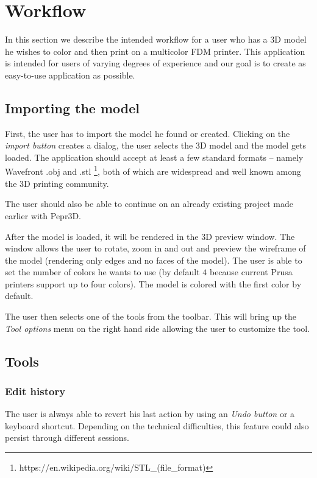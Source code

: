 \section{Workflow}

In this section we describe the intended workflow for a user who has a 3D model he wishes to color and then print on a multicolor FDM printer. This application is intended for users of varying degrees of experience and our goal is to create as easy-to-use application as possible.

\subsection{Importing the model}

First, the user has to import the model he found or created. Clicking on the \textit{import button} creates a dialog, the user selects the 3D model and the model gets loaded. The application should accept at least a few standard formats -- namely Wavefront $.$obj and $.$stl \footnote{https://en.wikipedia.org/wiki/STL\_(file\_format)}, both of which are widespread and well known among the 3D printing community.

The user should also be able to continue on an already existing project made earlier with Pepr3D.

After the model is loaded, it will be rendered in the 3D preview window. The window allows the user to rotate, zoom in and out and preview the wireframe of the model (rendering only edges and no faces of the model). The user is able to set the number of colors he wants to use (by default $4$ because current Prusa printers support up to four colors). The model is colored with the first color by default.

The user then selects one of the tools from the toolbar. This will bring up the \textit{Tool options} menu on the right hand side allowing the user to customize the tool.

\subsection{Tools}

\subsubsection{Edit history}
The user is always able to revert his last action by using an \textit{Undo button} or a keyboard shortcut. Depending on the technical difficulties, this feature could also persist through different sessions.

